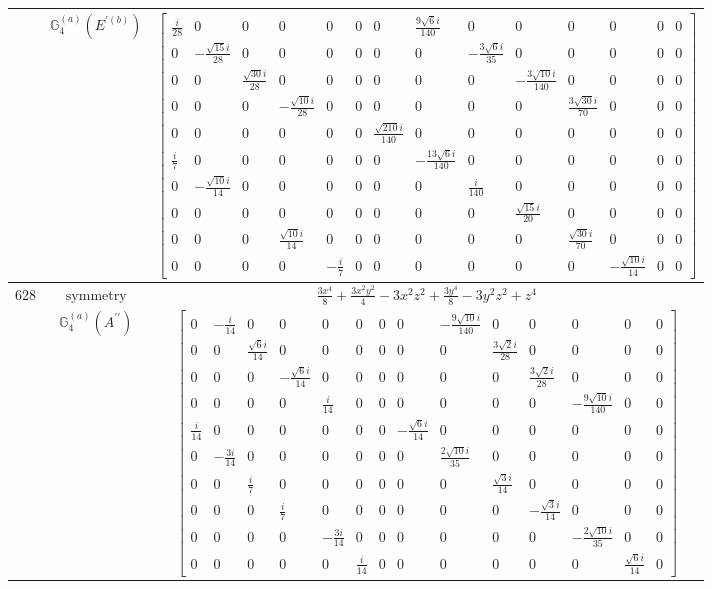 \documentclass[fleqn,8pt,landscape]{jsarticle}
\begin{document}
\begin{longtable}{ccc}
$  $ & $ \mathbb{G}_{4}^{(a)}(E^{\prime(b)}) $ & $ \begin{bmatrix} \frac{i}{28} & 0 & 0 & 0 & 0 & 0 & 0 & \frac{9 \sqrt{6} i}{140} & 0 & 0 & 0 & 0 & 0 & 0 \\ 0 & - \frac{\sqrt{15} i}{28} & 0 & 0 & 0 & 0 & 0 & 0 & - \frac{3 \sqrt{6} i}{35} & 0 & 0 & 0 & 0 & 0 \\ 0 & 0 & \frac{\sqrt{30} i}{28} & 0 & 0 & 0 & 0 & 0 & 0 & - \frac{3 \sqrt{10} i}{140} & 0 & 0 & 0 & 0 \\ 0 & 0 & 0 & - \frac{\sqrt{10} i}{28} & 0 & 0 & 0 & 0 & 0 & 0 & \frac{3 \sqrt{30} i}{70} & 0 & 0 & 0 \\ 0 & 0 & 0 & 0 & 0 & 0 & \frac{\sqrt{210} i}{140} & 0 & 0 & 0 & 0 & 0 & 0 & 0 \\ \frac{i}{7} & 0 & 0 & 0 & 0 & 0 & 0 & - \frac{13 \sqrt{6} i}{140} & 0 & 0 & 0 & 0 & 0 & 0 \\ 0 & - \frac{\sqrt{10} i}{14} & 0 & 0 & 0 & 0 & 0 & 0 & \frac{i}{140} & 0 & 0 & 0 & 0 & 0 \\ 0 & 0 & 0 & 0 & 0 & 0 & 0 & 0 & 0 & \frac{\sqrt{15} i}{20} & 0 & 0 & 0 & 0 \\ 0 & 0 & 0 & \frac{\sqrt{10} i}{14} & 0 & 0 & 0 & 0 & 0 & 0 & \frac{\sqrt{30} i}{70} & 0 & 0 & 0 \\ 0 & 0 & 0 & 0 & - \frac{i}{7} & 0 & 0 & 0 & 0 & 0 & 0 & - \frac{\sqrt{10} i}{14} & 0 & 0 \end{bmatrix} $ \\ \hline
$ 628 $ & $ \text{symmetry} $ & $ \frac{3 x^{4}}{8} + \frac{3 x^{2} y^{2}}{4} - 3 x^{2} z^{2} + \frac{3 y^{4}}{8} - 3 y^{2} z^{2} + z^{4} $ \\
$  $ & $ \mathbb{G}_{4}^{(a)}(A^{\prime\prime}) $ & $ \begin{bmatrix} 0 & - \frac{i}{14} & 0 & 0 & 0 & 0 & 0 & 0 & - \frac{9 \sqrt{10} i}{140} & 0 & 0 & 0 & 0 & 0 \\ 0 & 0 & \frac{\sqrt{6} i}{14} & 0 & 0 & 0 & 0 & 0 & 0 & \frac{3 \sqrt{2} i}{28} & 0 & 0 & 0 & 0 \\ 0 & 0 & 0 & - \frac{\sqrt{6} i}{14} & 0 & 0 & 0 & 0 & 0 & 0 & \frac{3 \sqrt{2} i}{28} & 0 & 0 & 0 \\ 0 & 0 & 0 & 0 & \frac{i}{14} & 0 & 0 & 0 & 0 & 0 & 0 & - \frac{9 \sqrt{10} i}{140} & 0 & 0 \\ \frac{i}{14} & 0 & 0 & 0 & 0 & 0 & 0 & - \frac{\sqrt{6} i}{14} & 0 & 0 & 0 & 0 & 0 & 0 \\ 0 & - \frac{3 i}{14} & 0 & 0 & 0 & 0 & 0 & 0 & \frac{2 \sqrt{10} i}{35} & 0 & 0 & 0 & 0 & 0 \\ 0 & 0 & \frac{i}{7} & 0 & 0 & 0 & 0 & 0 & 0 & \frac{\sqrt{3} i}{14} & 0 & 0 & 0 & 0 \\ 0 & 0 & 0 & \frac{i}{7} & 0 & 0 & 0 & 0 & 0 & 0 & - \frac{\sqrt{3} i}{14} & 0 & 0 & 0 \\ 0 & 0 & 0 & 0 & - \frac{3 i}{14} & 0 & 0 & 0 & 0 & 0 & 0 & - \frac{2 \sqrt{10} i}{35} & 0 & 0 \\ 0 & 0 & 0 & 0 & 0 & \frac{i}{14} & 0 & 0 & 0 & 0 & 0 & 0 & \frac{\sqrt{6} i}{14} & 0 \end{bmatrix} $ \\ \hline

\end{longtable}
\end{document}
